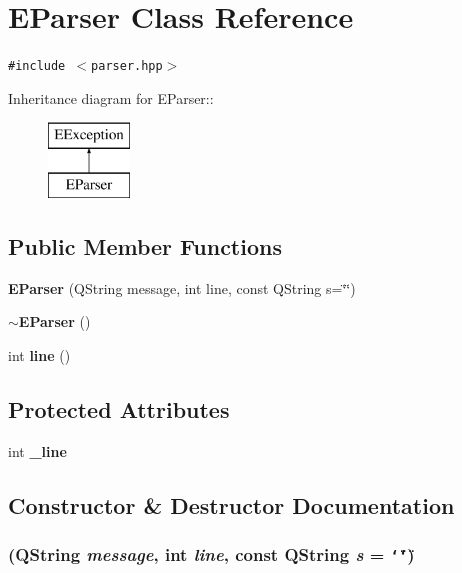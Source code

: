 \section{EParser Class Reference}
\label{classEParser}
{\tt \#include $<$parser.hpp$>$}

Inheritance diagram for EParser::\begin{figure}[H]
\begin{center}
\leavevmode
\includegraphics[height=2cm]{classEParser}
\end{center}
\end{figure}
\subsection*{Public Member Functions}
\begin{CompactItemize}
\item 
{\bf EParser} (QString message, int line, const QString s=\char`\"{}\char`\"{})
\item 
{\bf $\sim$EParser} ()
\item 
int {\bf line} ()
\end{CompactItemize}
\subsection*{Protected Attributes}
\begin{CompactItemize}
\item 
int {\bf \_\-line}
\end{CompactItemize}


\subsection{Constructor \& Destructor Documentation}
\subsubsection{ (QString {\em message}, int {\em line}, const QString {\em s} = {\tt \char`\"{}\char`\"{}})\hspace{0.3cm}{\tt  [inline]}}\label{classEParser_a0}


